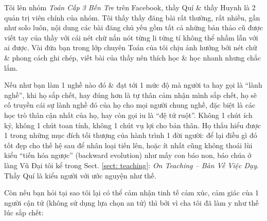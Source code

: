 \documentclass[12pt,oneside]{book}
\begin{document}
Tôi lên nhóm {\it Toán Cấp 3 Bến Tre} trên Facebook, thầy {\sc Quí} \& thầy {\sc Huynh} là 2 quản trị viên chính của nhóm. Tôi thấy thầy đăng bài rất thường, rất nhiều, gần như solo luôn, nội dung các bài đăng chủ yếu gồm tất cả những bản thảo cũ được viết tay của thầy với cái nét chữ nắn nót từng li từng tí không thể nhầm lẫn với ai được. Vài đứa bạn trong lớp chuyên Toán của tôi chịu ảnh hưởng bởi nét chữ \& phong cách ghi chép, viết bài của thầy nên thích học \& học nhanh nhưng chắc lắm.

Nếu như bạn làm 1 nghề nào đó \& đạt tới 1 mức độ mà người ta hay gọi là ``lành nghề'', khi họ sắp chết, hay đúng hơn là tự thân cảm nhận mình sắp chết, họ sẽ cố truyền cái sự lành nghề đó của họ cho mọi người chung nghề, đặc biệt là các học trò thân cận nhất của họ, hay còn gọi iu là ``đệ tử ruột''. Không 1 chút ích kỷ, không 1 chút toan tính, không 1 chút vụ lợi cho bản thân. Họ thấu hiểu được 1 trong những mục đích tối thượng của hành trình 1 đời người: để lại điều gì đó tốt đẹp cho thế hệ sau để nhân loại tiến lên, hoặc ít nhất cũng không thoái lùi kiểu ``tiến hóa ngược'' (backward evolution) như mấy con báo non, báo chúa ở làng Vũ Đại tôi kể trong Sect. \ref{sect: teaching}: {\it On Teaching -- Bàn Về Việc Dạy}. Thầy {\sc Quí} là kiểu người với ước nguyện như thế.

Còn nếu bạn hỏi tại sao tôi lại có thể cảm nhận tinh tế cảm xúc, cảm giác của 1 người cận tử (không sử dụng lựa chọn an tử) thì bởi vì cha tôi đã làm y như thế lúc sắp chết:
\end{document}
